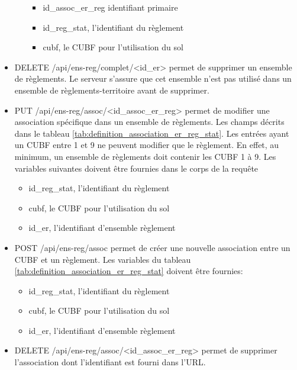 \begin{itemize}
\begin{itemize}
                \begin{itemize} 
                    \item id\_assoc\_er\_reg identifiant primaire
                    \item id\_reg\_stat, l'identifiant du règlement
                    \item cubf, le \ac{CUBF} pour l'utilisation du sol
                \end{itemize}
        \end{itemize}
    \item DELETE /api/ens-reg/complet/<id\_er> permet de supprimer un ensemble de règlements. Le serveur s'assure que cet ensemble n'est pas utilisé dans un ensemble de règlements-territoire avant de supprimer.
    \item PUT /api/ens-reg/assoc/<id\_assoc\_er\_reg> permet de modifier une association spécifique dans un ensemble de règlements. Les champs décrits dans le tableau \ref{tab:definition_association_er_reg_stat}. Les entrées ayant un \ac{CUBF} entre 1 et 9 ne peuvent modifier que le règlement. En effet, au minimum, un ensemble de règlements doit contenir les CUBF 1 à 9. Les variables suivantes doivent être fournies dans le corps de la requête
    \begin{itemize}
        \item id\_reg\_stat, l'identifiant du règlement
        \item cubf, le \ac{CUBF} pour l'utilisation du sol
        \item id\_er, l'identifiant d'ensemble règlement
    \end{itemize}
    \item POST /api/ens-reg/assoc permet de créer une nouvelle association entre un \ac{CUBF} et un règlement. Les variables du tableau \ref{tab:definition_association_er_reg_stat} doivent être fournies:
    \begin{itemize}
        \item id\_reg\_stat, l'identifiant du règlement
        \item cubf, le \ac{CUBF} pour l'utilisation du sol
        \item id\_er, l'identifiant d'ensemble règlement
    \end{itemize}
    \item DELETE /api/ens-reg/assoc/<id\_assoc\_er\_reg> permet de supprimer l'association dont l'identifiant est fourni dans l'\ac{URL}.
\end{itemize}\clearpage
